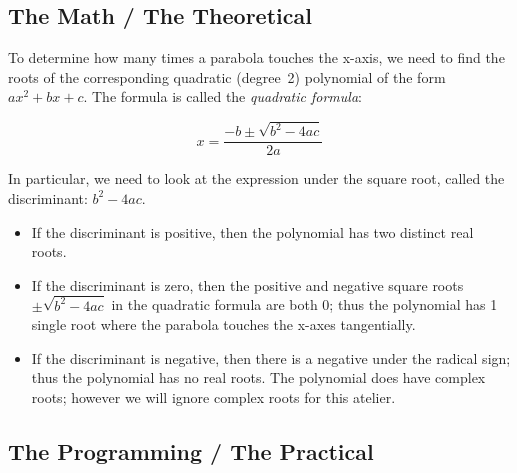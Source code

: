 \subsection{The Math / The Theoretical}

To determine how many times a parabola touches the x-axis, we need to
find the roots of the corresponding quadratic (degree~2) polynomial of
the form $a x^2 + b x + c$.  The formula is called the \emph{quadratic
formula}:

\[x = \frac{-b\pm\sqrt{b^2 - 4a c}}{2a}\]

In particular,
we need to look at the expression under the square root, called the
discriminant: $b^2 - 4a c$.
\begin{itemize}
\item If the discriminant is positive, then the polynomial has two
  distinct real roots.
\item If the discriminant is zero, then the positive and negative
  square roots $\pm\sqrt{b^2 - 4a c}$ in the quadratic formula are
  both 0; thus the polynomial has 1 single root where the parabola
  touches the x-axes tangentially.
  
\item If the discriminant is negative, then there is a negative under
  the radical sign; thus the polynomial has no real roots.  The
  polynomial does have complex roots; however we will ignore complex
  roots for this atelier.
\end{itemize}

\subsection{The Programming / The Practical}

